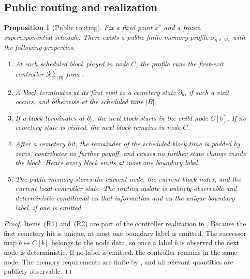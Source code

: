 \documentclass[12pt]{article}
\newtheorem{proposition}[theorem]{Proposition}
\theoremstyle{definition}
\newcommand{\1}{\mathbf{1}}
\begin{document}
\subsection{Public routing and realization}

\begin{proposition}[Public routing]
\label{prop:public-routing}
Fix a fixed point $x^*$ and a frozen superexponential schedule. There exists a
public finite-memory profile $\sigma_{\eta,\delta,M_*}$ with the following
properties.
\begin{enumerate}[label=\textnormal{(R\arabic*)},leftmargin=2.8em]
\item At each scheduled block played in node $C$, the profile runs the first-exit
controller $\mathcal R_{C,|B|}^{\sigma_C^*}$ from .
\item A block terminates at its first visit to a cemetery state $\partial_b$, if
such a visit occurs, and otherwise at the scheduled time $|B|$.
\item If a block terminates at $\partial_b$, the next block starts in the child
node $C[b]$. If no cemetery state is visited, the next block remains in node $C$.
\item After a cemetery hit, the remainder of the scheduled block time is padded by
zeros, contributes no further payoff, and causes no further state change inside the
block. Hence every block emits at most one boundary label.
\item The public memory stores the current node, the current block index, and the
current local controller state. The routing update is publicly observable and
deterministic conditional on that information and on the unique boundary label, if
one is emitted.
\end{enumerate}
\end{proposition}

\begin{proof}
Items~(R1) and~(R2) are part of the controller realization in
. Because the first cemetery hit is unique, at most one
boundary label is emitted. The successor map $b\mapsto C[b]$ belongs to the node
data, so once a label $b$ is observed the next node is deterministic. If no label
is emitted, the controller remains in the same node. The memory requirements are
finite by , and all relevant quantities are publicly
observable.
\end{proof}
\end{document}
